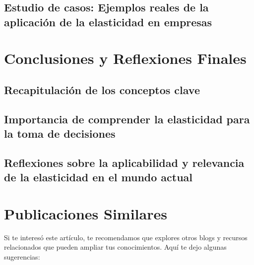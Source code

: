 \documentclass[
  jou,
  floatsintext,
  longtable,
  a4paper,
  nolmodern,
  notxfonts,
  notimes,
  12pt,
  colorlinks=true,linkcolor=blue,citecolor=blue,urlcolor=blue]{apa7}
\begin{document}
\subsection{Estudio de casos: Ejemplos reales de la aplicación de la
elasticidad en
empresas}\label{estudio-de-casos-ejemplos-reales-de-la-aplicaciuxf3n-de-la-elasticidad-en-empresas}

\section{Conclusiones y Reflexiones
Finales}\label{conclusiones-y-reflexiones-finales}

\subsection{Recapitulación de los conceptos
clave}\label{recapitulaciuxf3n-de-los-conceptos-clave}

\subsection{Importancia de comprender la elasticidad para la toma de
decisiones}\label{importancia-de-comprender-la-elasticidad-para-la-toma-de-decisiones}

\subsection{Reflexiones sobre la aplicabilidad y relevancia de la
elasticidad en el mundo
actual}\label{reflexiones-sobre-la-aplicabilidad-y-relevancia-de-la-elasticidad-en-el-mundo-actual}

\section{Publicaciones Similares}\label{publicaciones-similares}

Si te interesó este artículo, te recomendamos que explores otros blogs y
recursos relacionados que pueden ampliar tus conocimientos. Aquí te dejo
algunas sugerencias:
\end{document}
